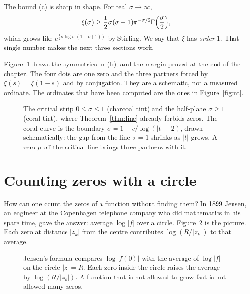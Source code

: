 The bound (c) is sharp in shape. For real $\sigma\to\infty$,
\[
\xi(\sigma)\ge\frac12\sigma(\sigma-1)\pi^{-\sigma/2}\Gamma\Bigl(\frac\sigma2\Bigr),
\]
which grows like $e^{\frac12\sigma\log\sigma\,(1+o(1))}$ by Stirling. We say that $\xi$ has \emph{order $1$}. That single number makes the next three sections work.

Figure~\ref{fig:zfree} draws the symmetries in (b), and the margin proved at the end of the chapter. The four dots are one zero and the three partners forced by $\xi(s)=\xi(1-s)$ and by conjugation. They are a schematic, not a measured ordinate. The ordinates that have been computed are the ones in Figure~\ref{fig:nt}.

\begin{figure}[ht]
\centering
{}
\caption{The critical strip $0\le\sigma\le1$ (charcoal tint) and the half-plane $\sigma\ge1$ (coral tint), where Theorem~\ref{thm:line} already forbids zeros. The coral curve is the boundary $\sigma=1-c/\log(|t|+2)$, drawn schematically: the gap from the line $\sigma=1$ shrinks as $|t|$ grows. A zero $\rho$ off the critical line brings three partners with it.}
\label{fig:zfree}
\end{figure}

\section{Counting zeros with a circle}

How can one count the zeros of a function without finding them? In 1899 Jensen, an engineer at the Copenhagen telephone company who did mathematics in his spare time, gave the answer: average $\log|f|$ over a circle. Figure~\ref{fig:jensencirc} is the picture. Each zero at distance $|z_k|$ from the centre contributes $\log(R/|z_k|)$ to that average.

\begin{figure}[ht]
\centering
{}
\caption{Jensen's formula compares $\log|f(0)|$ with the average of $\log|f|$ on the circle $|z|=R$. Each zero inside the circle raises the average by $\log(R/|z_k|)$. A function that is not allowed to grow fast is not allowed many zeros.}
\label{fig:jensencirc}
\end{figure}

